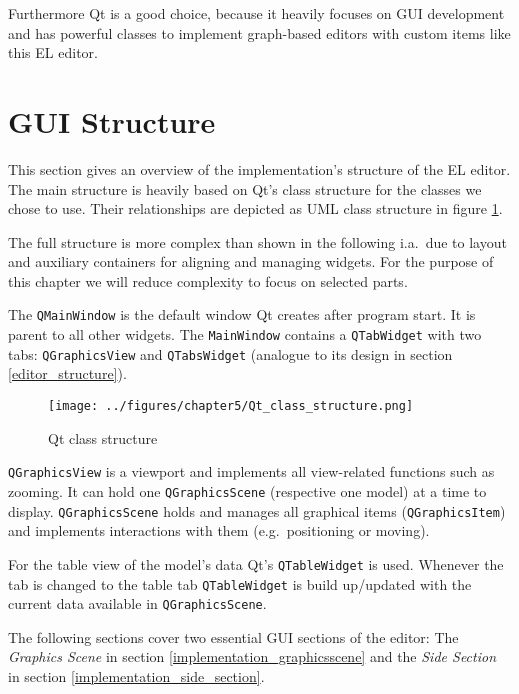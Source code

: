 \documentclass[twoside, openright, 12pt]{book}
\begin{document}
Furthermore Qt is a good choice, because it heavily focuses on GUI development and has powerful classes to implement graph-based editors with custom items like this EL editor.



\section{GUI Structure}
\label{implementation_structure}
This section gives an overview of the implementation's structure of the EL editor.
The main structure is heavily based on Qt's class structure for the classes we chose to use.
Their relationships are depicted as UML class structure in figure \ref{fig:Qt_class_structure}.

\begin{mdframed}[style=mystyle,frametitle=Note]
The full structure is more complex than shown in the following i.a.\ due to layout and auxiliary containers for aligning and managing widgets.
For the purpose of this chapter we will reduce complexity to focus on selected parts.
\end{mdframed}

\noindent
The \texttt{QMainWindow} is the default window Qt creates after program start.
It is parent to all other widgets.
The \texttt{MainWindow} contains a \texttt{QTabWidget} with two tabs: \texttt{QGraphicsView} and \texttt{QTabsWidget} (analogue to its design in section \ref{editor_structure}).

\begin{figure}[htb]
	\centering
	\texttt{[image: ../figures/chapter5/Qt\_class\_structure.png]}
	\caption{Qt class structure}
	\label{fig:Qt_class_structure}
\end{figure}

\noindent
\texttt{QGraphicsView} is a viewport and implements all view-related functions such as zooming.
It can hold one \texttt{QGraphicsScene} (respective one model) at a time to display.
\texttt{QGraphicsScene} holds and manages all graphical items (\texttt{QGraphicsItem}) and implements interactions with them (e.g.\ positioning or moving).

For the table view of the model's data Qt's \texttt{QTableWidget} is used.
Whenever the tab is changed to the table tab \texttt{QTableWidget} is build up/updated with the current data available in \texttt{QGraphicsScene}.

The following sections cover two essential GUI sections of the editor: The \textit{Graphics Scene} in section \ref{implementation_graphicsscene} and the \textit{Side Section} in section \ref{implementation_side_section}.
\end{document}
